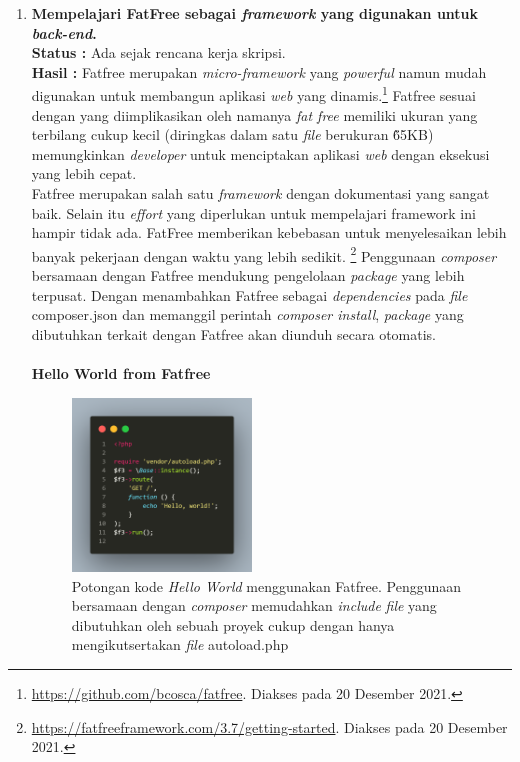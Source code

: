\documentclass[a4paper,twoside]{article}
\begin{document}
\begin{enumerate}
		\item \textbf{Mempelajari FatFree  sebagai \textit{framework} yang digunakan untuk \textit{back-end}.}\\
		{\bf Status :} Ada sejak rencana kerja skripsi.\\
		{\bf Hasil :} Fatfree merupakan \textit{micro-framework} yang \textit{powerful} namun mudah digunakan untuk membangun aplikasi \textit{web} yang dinamis.\footnote{\url{https://github.com/bcosca/fatfree}. Diakses pada 20 Desember 2021.} Fatfree sesuai dengan yang diimplikasikan oleh namanya \textit{fat free} memiliki ukuran yang terbilang cukup kecil (diringkas dalam satu \textit{file} berukuran \~65KB) memungkinkan \textit{developer} untuk menciptakan aplikasi \textit{web} dengan eksekusi yang lebih cepat.\\
		Fatfree merupakan salah satu \textit{framework} dengan dokumentasi yang sangat baik. Selain itu \textit{effort} yang diperlukan untuk mempelajari framework ini hampir tidak ada. FatFree memberikan kebebasan untuk menyelesaikan lebih banyak pekerjaan dengan waktu yang lebih sedikit. \footnote{\url{https://fatfreeframework.com/3.7/getting-started}. Diakses pada 20 Desember 2021.} Penggunaan \textit{composer} bersamaan dengan Fatfree mendukung pengelolaan \textit{package} yang lebih terpusat. Dengan menambahkan Fatfree sebagai \textit{dependencies} pada \textit{file} composer.json dan memanggil perintah \textit{composer install}, \textit{package} yang dibutuhkan terkait dengan Fatfree akan diunduh secara otomatis.\\
		\\
		\newpage
		\setlength\parindent{0pt}
		\textbf{Hello World from Fatfree}
		\setlength\parindent{24pt}
		 \begin{figure}[H]
            \centering
            \includegraphics[width=0.45\textwidth]{images/hello-world.png}
            \caption{Potongan kode \textit{Hello World} menggunakan Fatfree. Penggunaan bersamaan dengan \textit{composer} memudahkan \textit{include} \textit{file} yang dibutuhkan oleh sebuah proyek cukup dengan hanya mengikutsertakan \textit{file} autoload.php}
            \label{fig:f3-hello-world}
        \end{figure}
		

\end{enumerate}
\end{document}
